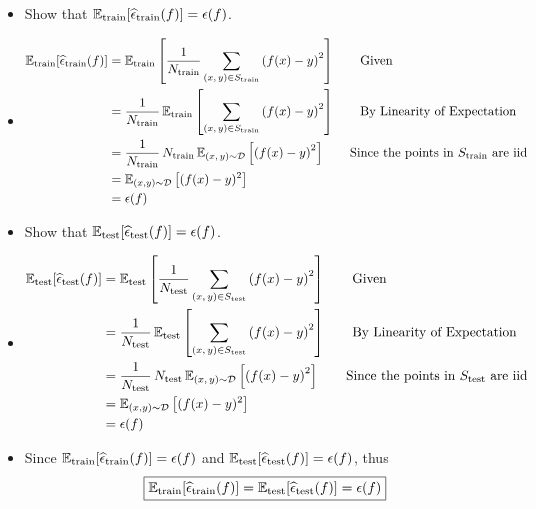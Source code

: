 \begin{itemize}
    \item Show that $\mathbb{E}_{\textrm{train}}[ \widehat{\epsilon}_{\textrm{train}}(f) ] = \epsilon(f)$.
    \item[] 
	\begin{align*}
	    \E_{\textrm{train}}[ \widehat{\epsilon}_{\textrm{train}}(f) ] 
		&=  \E_{\textrm{train}} \left[ \frac{1}{N_{\textrm{train}}} \sum_{(x, \, y)\in S_{\textrm{train}}} \left( f(x) - y \right)^2 \right] \tag*{Given} \\
		&= \frac{1}{N_{\textrm{train}}} \, \E_{\textrm{train}} \left[  \sum_{(x, \, y)\in S_{\textrm{train}}} \left( f(x) - y \right)^2 \right] \tag*{By Linearity of Expectation} \\
		&= \frac{1}{N_{\textrm{train}}} \, N_{\textrm{train}} \, \E_{(x,\, y) \sim \mathcal{D}} \left[  \left( f(x) - y \right)^2 \right] \tag*{Since the points in $S_{\textrm{train}}$ are iid} \\
		&= \E_{(x,y) \sim \mathcal{D}} \left[ (f(x) -y)^2 \right] \\
		&= \epsilon(f)
	\end{align*}
    \item Show that $\mathbb{E}_{\textrm{test}}[ \widehat{\epsilon}_{\textrm{test}}(f) ] = \epsilon(f)$.
    \item[] 
	\begin{align*}
	    \E_{\textrm{test}}[ \widehat{\epsilon}_{\textrm{test}}(f) ] 
		&=  \E_{\textrm{test}} \left[ \frac{1}{N_{\textrm{test}}} \sum_{(x, \, y)\in S_{\textrm{test}}} \left( f(x) - y \right)^2 \right] \tag*{Given} \\
		&= \frac{1}{N_{\textrm{test}}} \, \E_{\textrm{test}} \left[  \sum_{(x, \, y)\in S_{\textrm{test}}} \left( f(x) - y \right)^2 \right] \tag*{By Linearity of Expectation} \\
		&= \frac{1}{N_{\textrm{test}}} \, N_{\textrm{test}} \, \E_{(x,\, y) \sim \mathcal{D}} \left[  \left( f(x) - y \right)^2 \right] \tag*{Since the points in $S_{\textrm{test}}$ are iid} \\
		&= \E_{(x,y) \sim \mathcal{D}} \left[ (f(x) -y)^2 \right] \\
		&= \epsilon(f)
	\end{align*}
    \item Since $\mathbb{E}_{\textrm{train}}[ \widehat{\epsilon}_{\textrm{train}}(f) ] = \epsilon(f)$ and $\mathbb{E}_{\textrm{test}}[ \widehat{\epsilon}_{\textrm{test}}(f) ] = \epsilon(f)$, thus $$\boxed{ \mathbb{E}_{\textrm{train}}[ \widehat{\epsilon}_{\textrm{train}}(f) ] = \mathbb{E}_{\textrm{test}}[ \widehat{\epsilon}_{\textrm{test}}(f) ] = \epsilon(f) } $$

\end{itemize}
